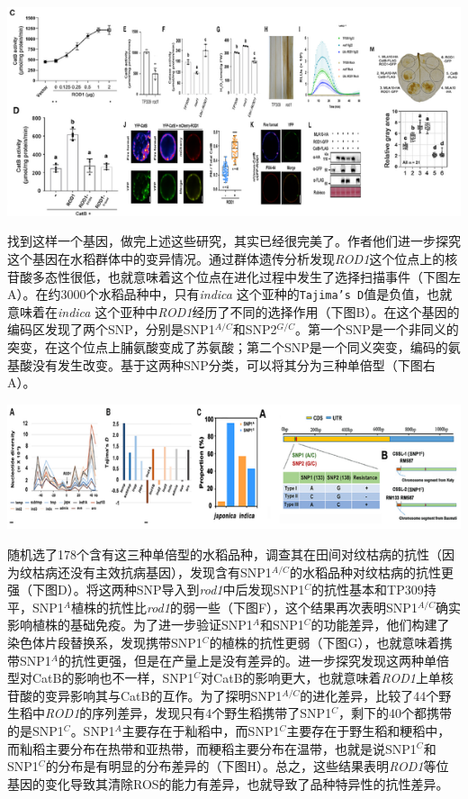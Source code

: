 \documentclass[
  10pt,
]{book}
\begin{document}
\includegraphics{figures/HeZuhuaCell2021/13.png}

找到这样一个基因，做完上述这些研究，其实已经很完美了。作者他们进一步探究这个基因在水稻群体中的变异情况。通过群体遗传分析发现\emph{ROD1}这个位点上的核苷酸多态性很低，也就意味着这个位点在进化过程中发生了选择扫描事件（下图左A）。在约3000个水稻品种中，只有\emph{indica} 这个亚种的\texttt{Tajima’s\ D}值是负值，也就意味着在\emph{indica} 这个亚种中\emph{ROD1}经历了不同的选择作用（下图B）。在这个基因的编码区发现了两个SNP，分别是SNP1\(^{A/C}\)和SNP2\(^{G/C}\)。第一个SNP是一个非同义的突变，在这个位点上脯氨酸变成了苏氨酸；第二个SNP是一个同义突变，编码的氨基酸没有发生改变。基于这两种SNP分类，可以将其分为三种单倍型（下图右A）。

\includegraphics{figures/HeZuhuaCell2021/14.png}

随机选了178个含有这三种单倍型的水稻品种，调查其在田间对纹枯病的抗性（因为纹枯病还没有主效抗病基因），发现含有SNP1\(^{A/C}\)的水稻品种对纹枯病的抗性更强（下图D）。将这两种SNP导入到\emph{rod1}中后发现SNP1\(^{C}\)的抗性基本和TP309持平，SNP1\(^{A}\)植株的抗性比\emph{rod1}的弱一些（下图F），这个结果再次表明SNP1\(^{A/C}\)确实影响植株的基础免疫。为了进一步验证SNP1\(^{A}\)和SNP1\(^{C}\)的功能差异，他们构建了染色体片段替换系，发现携带SNP1\(^{C}\)的植株的抗性更弱（下图G），也就意味着携带SNP1\(^{A}\)的抗性更强，但是在产量上是没有差异的。进一步探究发现这两种单倍型对CatB的影响也不一样，SNP1\(^{C}\)对CatB的影响更大，也就意味着\emph{ROD1}上单核苷酸的变异影响其与CatB的互作。为了探明SNP1\(^{A/C}\)的进化差异，比较了44个野生稻中\emph{ROD1}的序列差异，发现只有4个野生稻携带了SNP1\(^{C}\)，剩下的40个都携带的是SNP1\(^{C}\)。SNP1\(^{A}\)主要存在于籼稻中，而SNP1\(^{C}\)主要存在于野生稻和粳稻中，而籼稻主要分布在热带和亚热带，而粳稻主要分布在温带，也就是说SNP1\(^{C}\)和SNP1\(^{C}\)的分布是有明显的分布差异的（下图H）。总之，这些结果表明\emph{ROD1}等位基因的变化导致其清除ROS的能力有差异，也就导致了品种特异性的抗性差异。
\end{document}

